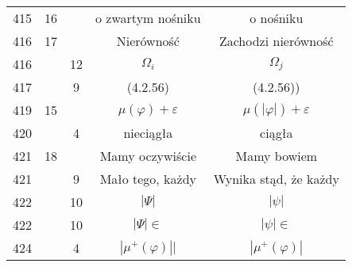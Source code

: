 \documentclass[a4paper,11pt]{article}
\begin{document}
\begin{center}
\begin{tabular}{|c|c|c|c|c|}
    415 & 16 & & o zwartym nośniku & o nośniku \\
    416 & 17 & & Nierówność & Zachodzi nierówność \\
    416 & & 12 & $\Omega_{ i }$ & $\Omega_{ j }$ \\
    417 & &  9 & (4.2.56) & (4.2.56)) \\
    419 & 15 & & $\mu( \varphi ) + \varepsilon$
           & $\mu( | \varphi | ) + \varepsilon$ \\
    420 & &  4 & nieciągła & ciągła \\
    421 & 18 & & Mamy oczywiście & Mamy bowiem \\
    421 & &  9 & Mało tego, każdy & Wynika stąd, że każdy \\
    422 & & 10 & $| \Psi | $ & $| \psi |$ \\
    422 & & 10 & $| \Psi | \in$ & $| \psi | \in$ \\
    424 & &  4 & $| \mu^{ + }( \varphi ) ||$ & $| \mu^{ + }( \varphi ) |$ \\
    \hline
  \end{tabular}


\end{center}
\end{document}
